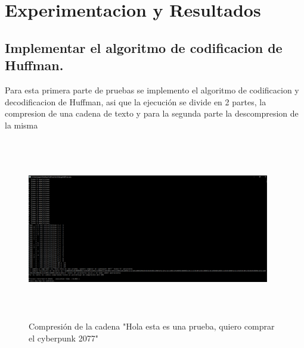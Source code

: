\documentclass[spanish]{article}
\begin{document}
	\section{Experimentacion y Resultados}
	\subsection{Implementar el algoritmo de codificacion de Huffman.}
	Para esta primera parte de pruebas se implemento el algoritmo de codificacion y decodificacion de Huffman, asi que la ejecución se divide en 2 partes, la compresion de una cadena de texto y para la segunda parte la descompresion de la misma
	\begin{figure}[H]
		\centering
		\includegraphics[width=400px,height=300px]{captura1}
		\caption{Compresión de la cadena "Hola esta es una prueba, quiero comprar el cyberpunk 2077"}
	\end{figure}
	
\end{document}
